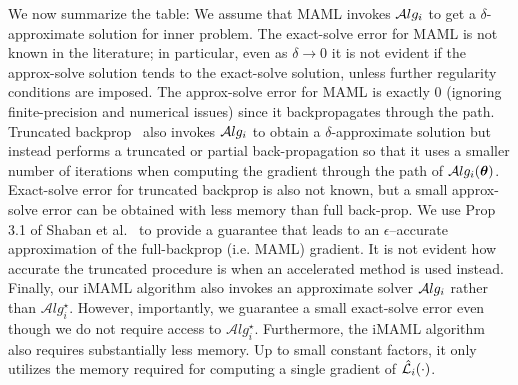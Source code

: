 \documentclass{article} \usepackage[nonatbib, final]{mod_neurips}
\newcommand{\prior}{{\bm{\theta}}}               \newcommand{\priorspace}{\Theta}
\newcommand{\algstar}{\mathcal{A}lg^\star}
\begin{document}
We now summarize the table: We assume that MAML invokes $\mathcal{A}lg_i$ to get a $\delta$-approximate solution for inner problem. The exact-solve
error for MAML is not known in the literature; in particular, even as
$\delta\rightarrow 0$ it is not evident if the approx-solve solution
tends to the exact-solve solution, unless further regularity
conditions are imposed. The approx-solve error for MAML is exactly $0$
(ignoring finite-precision and numerical issues) since it
backpropagates through the path. Truncated
backprop~\cite{Shaban2018TruncatedBF} also invokes $\mathcal{A}lg_i$ to obtain a $\delta$-approximate solution but instead performs a truncated or partial back-propagation so that it uses a smaller number of
iterations when computing the gradient through the path of
$\alg_i(\prior)$. Exact-solve error for truncated backprop is also not
known, but a small approx-solve error can be obtained with less memory
than full back-prop. We use Prop 3.1 of Shaban et al.~\cite{Shaban2018TruncatedBF} to provide a guarantee that leads to an
$\epsilon$--accurate approximation of the full-backprop (i.e. MAML)
gradient. It is not evident how accurate the truncated procedure is
when an accelerated method is used instead. Finally, our iMAML
algorithm also invokes an approximate solver $\mathcal{A}lg_i$ rather than $\algstar_i$. However, importantly, we guarantee a
small exact-solve error even though we do not require access to
$\algstar_i$. Furthermore, the iMAML algorithm also requires substantially less
memory. Up to small constant factors, it only utilizes the memory required for computing a single
gradient of $\hat{\mathcal{L}}_i(\cdot)$.
\fi
\end{document}
